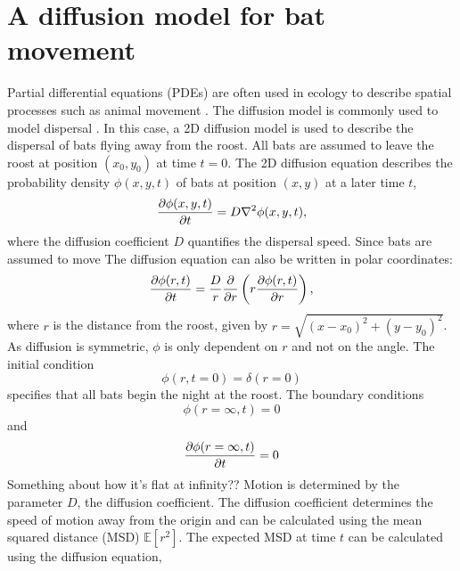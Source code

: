 \section{A diffusion model for bat movement}
%
Partial differential equations (PDEs) are often used in ecology to describe spatial processes such as animal movement \cite{Holmes1994}. The diffusion model is commonly used to model dispersal \cite{Ovaskainen2016}. In this case, a 2D diffusion model is used to describe the dispersal of bats flying away from the roost.
%
All bats are assumed to leave the roost at position $(x_0,y_0)$ at time $t=0$. The 2D diffusion equation describes the probability density $\phi(x,y,t)$ of
bats at position $(x,y)$ at a later time $t$,
%
\begin{equation}
  \frac{\partial \phi(x,y,t)}{\partial t} = D \nabla^2 \phi(x,y,t) ,
  \label{eqn:diffusion_cartesian}
\end{equation}
%
where the diffusion coefficient $D$ quantifies the dispersal speed. Since bats are assumed to move The diffusion equation can also be written in polar coordinates:
%
\begin{equation}
\frac{\partial  \phi(r,t)}{\partial t} = \frac{D}{r} \frac{\partial }{\partial  r} \left( r \frac{\partial \phi(r,t)}{\partial r} \right),
\label{eqn:diffusion_polar}
\end{equation}
%
where $r$ is the distance from the roost, given by $r=\sqrt{(x-x_0)^2 + (y-y_0)^2}$. As diffusion is symmetric, $\phi$ is only dependent on $r$ and not on the angle.
%
The initial condition
%
\begin{equation}
\phi(r,t=0) = \delta(r=0)
\label{eqn:IC}
\end{equation}
%
specifies that all bats begin the night at the roost. The boundary conditions
%
\begin{equation}
\phi(r=\infty,t) = 0
\label{eqn:IC}
\end{equation}
%
and
%
\begin{equation}
\frac{\partial \phi(r=\infty,t)}{\partial t} = 0
\label{eqn:IC}
\end{equation}
%
{\huge Something about how it's flat at infinity??}
%
Motion is determined by the parameter $D$, the diffusion coefficient. The diffusion coefficient determines the speed of motion away from the origin and can be calculated using the mean squared distance (MSD) $\mathbb{E}[r^2]$. The expected MSD at time $t$ can be calculated using the diffusion equation,

